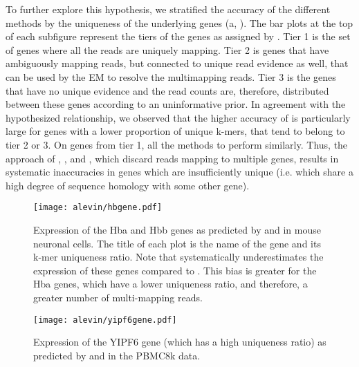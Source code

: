 To further explore this hypothesis, we stratified the accuracy of the different methods by the uniqueness of the underlying genes (a, ). The bar plots at the top of each subfigure represent the tiers of the genes as assigned by \alevin. Tier 1 is the set of genes where all the reads are uniquely mapping. Tier 2 is genes that have ambiguously mapping reads, but connected to unique read evidence as well, that can be used by the EM to resolve the multimapping reads. Tier 3 is the genes that have no unique evidence and the read counts are, therefore, distributed between these genes according to an uninformative prior. In agreement with the hypothesized relationship, we observed that the higher accuracy of \alevin is particularly large for genes with a lower proportion of unique k-mers, that tend to belong to tier 2 or 3. On genes from tier 1, all the methods to perform similarly. Thus, the approach of \cellr, \dropest, and \naive, which discard reads mapping to multiple genes, results in systematic inaccuracies in genes which are insufficiently unique (i.e. which share a high degree of sequence homology with some other gene). 

\begin{figure*}[!htb]
  \texttt{[image: alevin/hbgene.pdf]}
  \caption{Expression of the Hba and Hbb genes as predicted by \alevin and \cellr in mouse neuronal cells. The title of each plot is the name of the gene and its k-mer uniqueness ratio. Note that \cellr systematically underestimates the expression of these genes compared to \alevin. This bias is greater for the Hba genes, which have a lower uniqueness ratio, and therefore, a greater number of multi-mapping reads.}
  \label{fig:hbgene}
\end{figure*}

\begin{figure}[!htb]
    \centering
  \texttt{[image: alevin/yipf6gene.pdf]}
  \caption{Expression of the YIPF6 gene (which has a high uniqueness ratio) as predicted by \alevin and \cellr in the PBMC8k data.}
  \label{fig:yipgene}
\end{figure}

